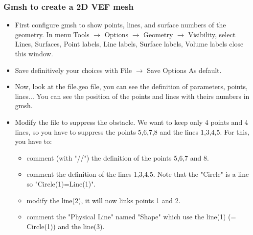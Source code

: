 \documentclass[10pt, hyperref={unicode=true,pdfusetitle, bookmarks=true,bookmarksnumbered=false,bookmarksopen=false, breaklinks=false,pdfborder={0 0l 1},backref=true,colorlinks=true,linkcolor=darkblue,pageanchor}]{beamer}
\begin{document}
\begin{frame}
\frametitle{Gmsh to create a 2D VEF mesh}
\begin{block}{}

\begin{itemize}
\item First configure gmsh to show points, lines, and surface numbers of the geometry. In menu Tools $\rightarrow$ Options $\rightarrow$ Geometry $\rightarrow$ Visibility, select Lines, Surfaces, Point labels, Line labels, Surface labels, Volume labels close this window. 
\item Save definitively your choices with File $\rightarrow$ Save Options As default.

\item Now, look at the file.geo file, you can see the definition of parameters, points, lines... You can see the position of the points and lines with theirs numbers in gmsh.

\item Modify the file to suppress the obstacle. We want to keep only 4 points and 4 lines, so you have to suppress the points 5,6,7,8 and the lines 1,3,4,5. For this, you have to:
    \begin{itemize}
    \item [$\circ$] comment (with "//") the definition of the points 5,6,7 and 8.
    \item [$\circ$] comment the definition of the lines 1,3,4,5. Note that the "Circle" is a line so "Circle(1)=Line(1)".
    \item [$\circ$] modify the line(2), it will now links points 1 and 2.
    \item [$\circ$] comment the "Physical Line" named "Shape" which use the line(1) (= Circle(1)) and the line(3).
    \end{itemize}
\end{itemize}

\end{block}
\end{frame}
\end{document}

